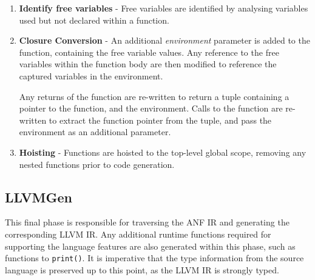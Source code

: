 \begin{enumerate}
      \item \textbf{Identify free variables} - Free variables are identified by
            analysing variables used but not declared within a function.

      \item \textbf{Closure Conversion} - An additional \emph{environment} parameter is added to the
            function, containing the free variable values. Any reference to the free variables
            within the function body are then modified to reference the captured variables in the
            environment.

            Any returns of the function are re-written to return a tuple containing a pointer to the
            function, and the environment. Calls to the function are re-written to extract the
            function pointer from the tuple, and pass the environment as an additional parameter.

      \item \textbf{Hoisting} - Functions are hoisted to the top-level global scope, removing any
            nested functions prior to code generation.
\end{enumerate}

\subsection{LLVMGen}

This final phase is responsible for traversing the ANF IR and generating the corresponding LLVM IR.
Any additional runtime functions required for supporting the language features are also generated
within this phase, such as functions to \texttt{print()}. It is imperative that the type information
from the source language is preserved up to this point, as the LLVM IR is strongly typed.

